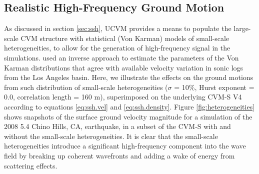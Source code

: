 
\subsection{Realistic High-Frequency Ground Motion}

As discussed in section \ref{sec:ssh}, UCVM provides a means to populate the large-scale CVM structure with statistical (Von Karman) models of small-scale heterogeneities, to allow for the generation of high-frequency signal in the simulations. \citet{Olsen_2014_USGS} used an inverse approach to estimate the parameters of the Von Karman distributions that agree with available velocity variation in sonic logs from the Los Angeles basin. Here, we illustrate the effects on the ground motions from such distribution of small-scale heterogeneities ($\sigma$ = 10\%, Hurst exponent = 0.0, correlation length = 160 m), superimposed on the underlying CVM-S V4 according to equations \eqref{eq:ssh.vel} and \eqref{eq:ssh.density}. Figure \ref{fig:heterogeneities} shows snapshots of the surface ground velocity magnitude for a simulation of the 2008  5.4 Chino Hills, CA, earthquake, in a subset of the CVM-S with and without the small-scale heterogeneities.  It is clear that the small-scale heterogeneities introduce a significant high-frequency component into the wave field by breaking up coherent wavefronts and adding a wake of energy from scattering effects.



